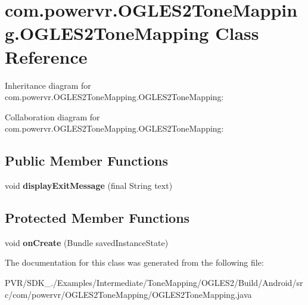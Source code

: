 \hypertarget{classcom_1_1powervr_1_1_o_g_l_e_s2_tone_mapping_1_1_o_g_l_e_s2_tone_mapping}{\section{com.\+powervr.\+O\+G\+L\+E\+S2\+Tone\+Mapping.\+O\+G\+L\+E\+S2\+Tone\+Mapping Class Reference}
\label{classcom_1_1powervr_1_1_o_g_l_e_s2_tone_mapping_1_1_o_g_l_e_s2_tone_mapping}
}


Inheritance diagram for com.\+powervr.\+O\+G\+L\+E\+S2\+Tone\+Mapping.\+O\+G\+L\+E\+S2\+Tone\+Mapping\+:


Collaboration diagram for com.\+powervr.\+O\+G\+L\+E\+S2\+Tone\+Mapping.\+O\+G\+L\+E\+S2\+Tone\+Mapping\+:
\subsection*{Public Member Functions}
\begin{DoxyCompactItemize}
\item 
\hypertarget{classcom_1_1powervr_1_1_o_g_l_e_s2_tone_mapping_1_1_o_g_l_e_s2_tone_mapping_ae2fe4e41574c43722ab2cfe161b93995}{void {\bfseries display\+Exit\+Message} (final String text)}\label{classcom_1_1powervr_1_1_o_g_l_e_s2_tone_mapping_1_1_o_g_l_e_s2_tone_mapping_ae2fe4e41574c43722ab2cfe161b93995}

\end{DoxyCompactItemize}
\subsection*{Protected Member Functions}
\begin{DoxyCompactItemize}
\item 
\hypertarget{classcom_1_1powervr_1_1_o_g_l_e_s2_tone_mapping_1_1_o_g_l_e_s2_tone_mapping_a4da1bc492fd416b5b97a79ae9804d162}{void {\bfseries on\+Create} (Bundle saved\+Instance\+State)}\label{classcom_1_1powervr_1_1_o_g_l_e_s2_tone_mapping_1_1_o_g_l_e_s2_tone_mapping_a4da1bc492fd416b5b97a79ae9804d162}

\end{DoxyCompactItemize}


The documentation for this class was generated from the following file\+:\begin{DoxyCompactItemize}
\item 
P\+V\+R/\+S\+D\+K\+\_./\+Examples/\+Intermediate/\+Tone\+Mapping/\+O\+G\+L\+E\+S2/\+Build/\+Android/src/com/powervr/\+O\+G\+L\+E\+S2\+Tone\+Mapping/O\+G\+L\+E\+S2\+Tone\+Mapping.\+java\end{DoxyCompactItemize}
